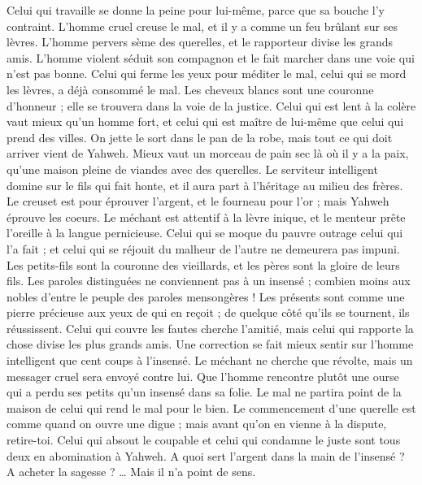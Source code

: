 \begin{multicols}{2}
Celui qui travaille se donne la peine pour lui-même, parce que sa bouche l’y contraint.
L’homme cruel creuse le mal, et il y a comme un feu brûlant sur ses lèvres.
L'homme pervers sème des querelles, et le rapporteur divise les grands amis.
L'homme violent séduit son compagnon et le fait marcher dans une voie qui n'est pas bonne.
Celui qui ferme les yeux pour méditer le mal, celui qui se mord les lèvres, a déjà consommé le mal.
Les cheveux blancs sont une couronne d'honneur ; elle se trouvera dans la voie de la justice.
Celui qui est lent à la colère vaut mieux qu’un homme fort, et celui qui est maître de lui-même que celui qui prend des villes.
On jette le sort dans le pan de la robe, mais tout ce qui doit arriver vient de Yahweh.
\VerseOne{}Mieux vaut un morceau de pain sec là où il y a la paix, qu'une maison pleine de viandes avec des querelles.
Le serviteur intelligent domine sur le fils qui fait honte, et il aura part à l'héritage au milieu des frères.
Le creuset est pour éprouver l'argent, et le fourneau pour l'or ; mais Yahweh éprouve les coeurs.
Le méchant est attentif à la lèvre inique, et le menteur prête l’oreille à la langue pernicieuse.
Celui qui se moque du pauvre outrage celui qui l’a fait ; et celui qui se réjouit du malheur de l’autre ne demeurera pas impuni.
Les petits-fils sont la couronne des vieillards, et les pères sont la gloire de leurs fils.
Les paroles distinguées ne conviennent pas à un insensé ; combien moins aux nobles d'entre le peuple des paroles mensongères !
Les présents sont comme une pierre précieuse aux yeux de qui en reçoit ; de quelque côté qu'ils se tournent, ils réussissent.
Celui qui couvre les fautes cherche l'amitié, mais celui qui rapporte la chose divise les plus grands amis.
Une correction se fait mieux sentir sur l'homme intelligent que cent coups à l’insensé.
Le méchant ne cherche que révolte, mais un messager cruel sera envoyé contre lui.
Que l'homme rencontre plutôt une ourse qui a perdu ses petits qu'un insensé dans sa folie.
Le mal ne partira point de la maison de celui qui rend le mal pour le bien.
Le commencement d'une querelle est comme quand on ouvre une digue ; mais avant qu'on en vienne à la dispute, retire-toi.
Celui qui absout le coupable et celui qui condamne le juste sont tous deux en abomination à Yahweh.
A quoi sert l’argent dans la main de l’insensé ? A acheter la sagesse ? … Mais il n’a point de sens.

\end{multicols}
